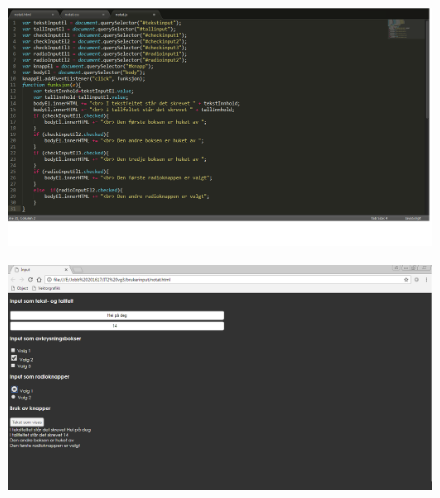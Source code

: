 \documentclass[a4paper, norsk, 10pt]{article}
\begin{document}
\begin{figure}[h!]
\includegraphics[width=0.8\linewidth]{js1.png}
\end{figure}
\begin{figure}[h!]
\includegraphics[width=0.8\linewidth]{js2.png}
\end{figure}
\end{document}
